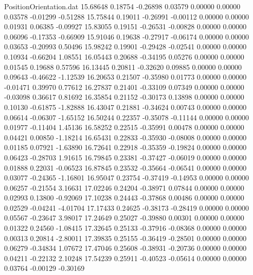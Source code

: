 \begin{filecontents}{PositionOrientation.dat}
  15.68648    0.18754   -0.26898     0.03579    0.00000    0.00000    0.03578   -0.01299   -0.51288
  15.75844    0.19011   -0.26991    -0.00112    0.00000    0.00000    0.01931    0.06385   -0.09927
  15.83055    0.19151   -0.26531    -0.00828    0.00000    0.00000    0.06096   -0.17353   -0.66909
  15.91046    0.19638   -0.27917    -0.06174    0.00000    0.00000    0.03653   -0.20993    0.50496
  15.98242    0.19901   -0.29428    -0.02541    0.00000    0.00000    0.10934   -0.66204    1.08551
  16.05443    0.20688   -0.34195     0.05276    0.00000    0.00000    0.01545    0.19688    0.57596
  16.13445    0.20811   -0.32620     0.09885    0.00000    0.00000    0.09643   -0.46622   -1.12539
  16.20653    0.21507   -0.35980     0.01773    0.00000    0.00000   -0.01471    0.39970    0.77612
  16.27837    0.21401   -0.33109     0.07349    0.00000    0.00000   -0.03098    0.36617    0.81692
  16.35854    0.21152   -0.30173     0.13898    0.00000    0.00000    0.10130   -0.61875   -1.82888
  16.43047    0.21881   -0.34624     0.00743    0.00000    0.00000    0.06614   -0.06307   -1.65152
  16.50244    0.22357   -0.35078    -0.11144    0.00000    0.00000    0.01977   -0.11404    1.45136
  16.58252    0.22515   -0.35991     0.00478    0.00000    0.00000    0.04421    0.00850   -1.18214
  16.65431    0.22833   -0.35930    -0.08008    0.00000    0.00000    0.01185    0.07921   -1.63890
  16.72641    0.22918   -0.35359    -0.19824    0.00000    0.00000    0.06423   -0.28703    1.91615
  16.79845    0.23381   -0.37427    -0.06019    0.00000    0.00000    0.01888    0.22031   -0.06523
  16.87845    0.23532   -0.35664    -0.06541    0.00000    0.00000    0.03077   -0.24365   -1.16801
  16.95047    0.23754   -0.37419    -0.14953    0.00000    0.00000    0.06257   -0.21554    3.16631
  17.02246    0.24204   -0.38971     0.07844    0.00000    0.00000    0.02993    0.13800   -0.92069
  17.10238    0.24443   -0.37868     0.00486    0.00000    0.00000    0.02529   -0.04241   -4.01704
  17.17433    0.24625   -0.38173    -0.28419    0.00000    0.00000    0.05567   -0.23647    3.98017
  17.24649    0.25027   -0.39880     0.00301    0.00000    0.00000    0.01322    0.24560   -1.08415
  17.32645    0.25133   -0.37916    -0.08368    0.00000    0.00000    0.00313    0.20814   -2.80011
  17.39835    0.25155   -0.36419    -0.28501    0.00000    0.00000    0.06279   -0.34834    1.07672
  17.47046    0.25608   -0.38931    -0.20736    0.00000    0.00000    0.04211   -0.22132    2.10248
  17.54239    0.25911   -0.40523    -0.05614    0.00000    0.00000    0.03764   -0.00129   -0.30169

\end{filecontents}
